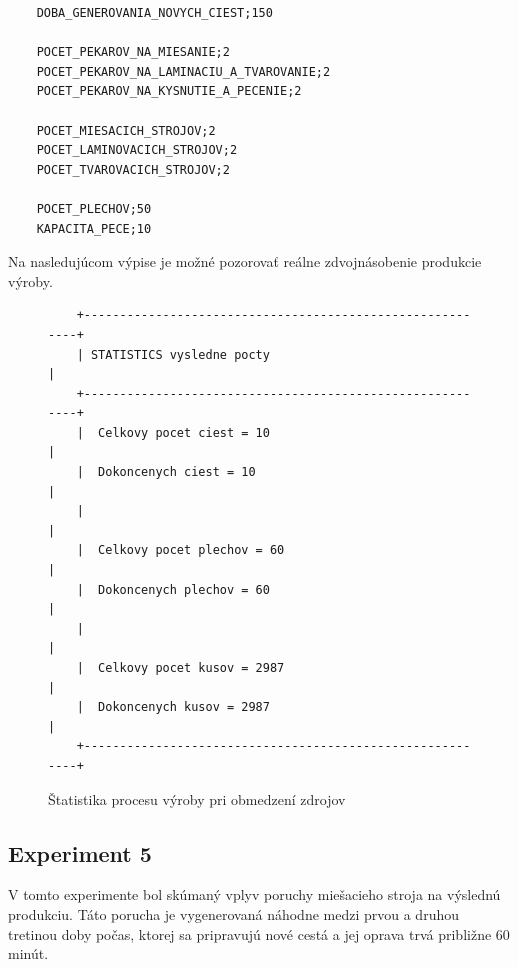 \documentclass[11pt]{article}
\begin{document}
\begin{verbatim}
    DOBA_GENEROVANIA_NOVYCH_CIEST;150
     
    POCET_PEKAROV_NA_MIESANIE;2
    POCET_PEKAROV_NA_LAMINACIU_A_TVAROVANIE;2
    POCET_PEKAROV_NA_KYSNUTIE_A_PECENIE;2
    
    POCET_MIESACICH_STROJOV;2
    POCET_LAMINOVACICH_STROJOV;2
    POCET_TVAROVACICH_STROJOV;2
    
    POCET_PLECHOV;50
    KAPACITA_PECE;10
\end{verbatim}

\newpage
Na nasledujúcom výpise je možné pozorovať reálne zdvojnásobenie produkcie výroby.

\begin{figure}[H]
\begin{verbatim}
    +----------------------------------------------------------+
    | STATISTICS vysledne pocty                                |
    +----------------------------------------------------------+
    |  Celkovy pocet ciest = 10                                |
    |  Dokoncenych ciest = 10                                  |
    |                                                          |
    |  Celkovy pocet plechov = 60                              |
    |  Dokoncenych plechov = 60                                |
    |                                                          |
    |  Celkovy pocet kusov = 2987                              |
    |  Dokoncenych kusov = 2987                                |
    +----------------------------------------------------------+
\end{verbatim}
\caption{Štatistika procesu výroby pri obmedzení zdrojov}
\label{fig:resources_limatation_experiment}
\end{figure}

\subsection{Experiment 5}
\label{exp:laminator_failure_experiment}
V tomto experimente bol skúmaný vplyv poruchy miešacieho stroja na výslednú produkciu. Táto porucha je vygenerovaná náhodne medzi prvou a druhou tretinou doby počas, ktorej sa pripravujú nové cestá a jej oprava trvá približne 60 minút.
\end{document}
